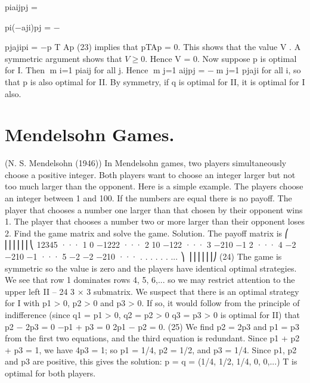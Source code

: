 \documentclass[]{report}
\begin{document}
piaijpj = 

pi(−aji)pj = −


pjajipi = −p
T
Ap (23)
implies that pTAp = 0. This shows that the value V . A symmetric argument shows
that $V \geq 0$. Hence V = 0. Now suppose p is optimal for I. Then m
i=1 piaij  for all
j. Hence m
j=1 aijpj = −m
j=1 pjaji  for all i, so that p is also optimal for II. By
symmetry, if q is optimal for II, it is optimal for I also.
\section{Mendelsohn Games.}
 (N. S. Mendelsohn (1946)) In Mendelsohn games, two players
simultaneously choose a positive integer. Both players want to choose an integer larger
but not too much larger than the opponent. Here is a simple example. The players choose
an integer between 1 and 100. If the numbers are equal there is no payoff. The player that
chooses a number one larger than that chosen by their opponent wins 1. The player that
chooses a number two or more larger than their opponent loses 2. Find the game matrix
and solve the game.
Solution. The payoff matrix is
⎛
⎜⎜⎜⎜⎜⎜⎝
12345 ···
1 0 −1222 ···
2 10 −122 ···
3 −210 −1 2 ···
4 −2 −210 −1 ···
5 −2 −2 −210 ··· .
.
. .
.
. ...
⎞
⎟⎟⎟⎟⎟⎟⎠
(24)
The game is symmetric so the value is zero and the players have identical optimal strategies.
We see that row 1 dominates rows 4, 5, 6,... so we may restrict attention to the upper left
II – 24
3 × 3 submatrix. We suspect that there is an optimal strategy for I with p1 > 0, p2 > 0
and p3 > 0. If so, it would follow from the principle of indifference (since q1 = p1 > 0,
q2 = p2 > 0 q3 = p3 > 0 is optimal for II) that
p2 − 2p3 = 0
−p1 + p3 = 0
2p1 − p2 = 0. (25)
We find p2 = 2p3 and p1 = p3 from the first two equations, and the third equation is
redundant. Since p1 + p2 + p3 = 1, we have 4p3 = 1; so p1 = 1/4, p2 = 1/2, and p3 = 1/4.
Since p1, p2 and p3 are positive, this gives the solution: p = q = (1/4, 1/2, 1/4, 0, 0,...)
T is
optimal for both players.
\end{document}

